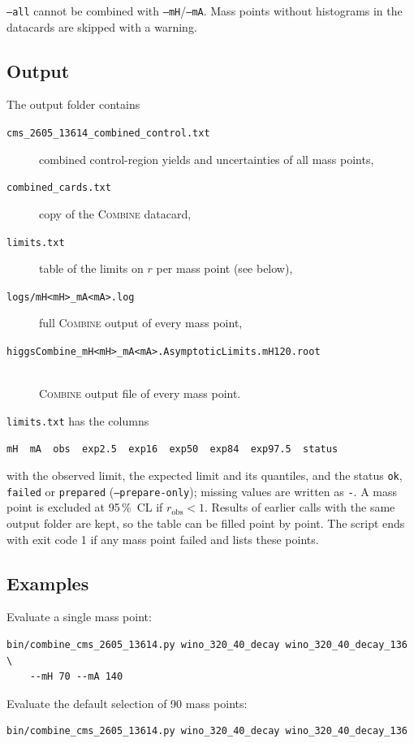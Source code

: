 \documentclass[11pt,a4paper]{article}
\newcommand{\combine}{\textsc{Combine}}
\newcommand{\file}[1]{\texttt{#1}}
\newcommand{\opt}[1]{\texttt{#1}}
\begin{document}
\opt{--all} cannot be combined with \opt{--mH}/\opt{--mA}. Mass points
without histograms in the datacards are skipped with a warning.

\subsection{Output}

The output folder contains
\begin{description}
  \item[\file{cms\_2605\_13614\_combined\_control.txt}] combined
        control-region yields and uncertainties of all mass points,
  \item[\file{combined\_cards.txt}] copy of the \combine{} datacard,
  \item[\file{limits.txt}] table of the limits on $r$ per mass point (see
        below),
  \item[\file{logs/mH<mH>\_mA<mA>.log}] full \combine{} output of every
        mass point,
  \item[\file{higgsCombine\_mH<mH>\_mA<mA>.AsymptoticLimits.mH120.root}]
        \mbox{}\\ \combine{} output file of every mass point.
\end{description}

\file{limits.txt} has the columns
\begin{lstlisting}
mH  mA  obs  exp2.5  exp16  exp50  exp84  exp97.5  status
\end{lstlisting}
with the observed limit, the expected limit and its quantiles, and the
status \texttt{ok}, \texttt{failed} or \texttt{prepared}
(\opt{--prepare-only}); missing values are written as \texttt{-}. A mass
point is excluded at 95\,\%~CL if $r_\mathrm{obs} < 1$. Results of earlier
calls with the same output folder are kept, so the table can be filled
point by point. The script ends with exit code 1 if any mass point failed
and lists these points.

\subsection{Examples}

Evaluate a single mass point:
\begin{lstlisting}
bin/combine_cms_2605_13614.py wino_320_40_decay wino_320_40_decay_136 \
    --mH 70 --mA 140
\end{lstlisting}

Evaluate the default selection of 90 mass points:
\begin{lstlisting}
bin/combine_cms_2605_13614.py wino_320_40_decay wino_320_40_decay_136
\end{lstlisting}
\end{document}
